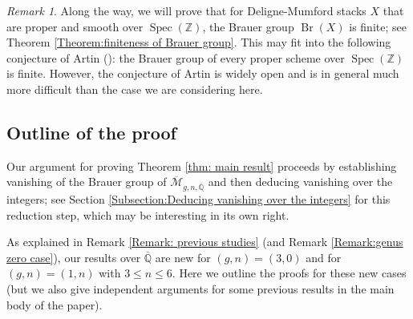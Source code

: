 \documentclass{amsart}
\theoremstyle{definition}
\theoremstyle{remark}
\newtheorem{remark}[prop]{Remark}
\DeclareMathOperator{\Spec}{Spec}
\DeclareMathOperator{\Br}{Br}
\newcommand{\Q}{\mathbb{Q}}
\newcommand{\ZZ}{\mathbb Z}
\begin{document}
\begin{remark}\label{Remark: finiteness of Brauer group}
    Along the way, we will prove that for Deligne-Mumford stacks $X$ that are proper and smooth over $\Spec (\ZZ)$, the Brauer group $\Br(X)$ is finite; see Theorem \ref{Theorem:finiteness of Brauer group}.
    This may fit into the following conjecture of Artin (\cite[Remarque 2.5 (c)]{GrothendieckGroupedeBrauerIII}): the Brauer group of every proper scheme over $\Spec (\ZZ)$ is finite.
    However, the conjecture of Artin is widely open and is in general much more difficult than the case we are considering here.
\end{remark}


\subsection{Outline of the proof}
Our argument for proving Theorem \ref{thm: main result} proceeds by establishing vanishing of the Brauer group of $\overline{\mathcal{M}}_{g,n,\overline{\Q}}$ and then deducing vanishing over the integers; see Section \ref{Subsection:Deducing vanishing over the integers} for this reduction step, which may be interesting in its own right.

As explained in Remark \ref{Remark: previous studies} (and Remark \ref{Remark:genus zero case}), our results over $\overline{\mathbb{Q}}$ are new for 
$(g, n)=(3, 0)$
and for
$(g, n)=(1,n)$ with  $3\leq n \leq 6$.
Here we outline the proofs for these new cases (but we also give independent arguments for some previous results in the main body of the paper).
\end{document}
